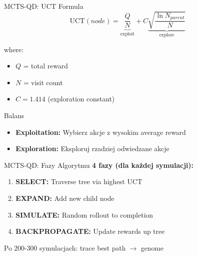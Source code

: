 \documentclass{beamer}
\begin{document}
\begin{frame}{MCTS-QD: UCT Formula}
\begin{equation}
\text{UCT}(node) = \underbrace{\frac{Q}{N}}_{\text{exploit}} + C\underbrace{\sqrt{\frac{\ln N_{parent}}{N}}}_{\text{explore}}
\end{equation}

where:
\begin{itemize}
\item $Q$ = total reward
\item $N$ = visit count
\item $C = 1.414$ (exploration constant)
\end{itemize}

\vspace{0.5cm}
\begin{block}{Balans}
\begin{itemize}
\item \textbf{Exploitation:} Wybierz akcje z wysokim average reward
\item \textbf{Exploration:} Eksploruj rzadziej odwiedzane akcje
\end{itemize}
\end{block}
\end{frame}

\begin{frame}[fragile]{MCTS-QD: Fazy Algorytmu}
\textbf{4 fazy (dla każdej symulacji):}

\begin{enumerate}
\item \textbf{SELECT:} Traverse tree via highest UCT
\item \textbf{EXPAND:} Add new child node
\item \textbf{SIMULATE:} Random rollout to completion
\item \textbf{BACKPROPAGATE:} Update rewards up tree
\end{enumerate}

\vspace{0.5cm}


\vspace{0.3cm}
Po 200-300 symulacjach: trace best path $\rightarrow$ genome
\end{frame}
\end{document}
